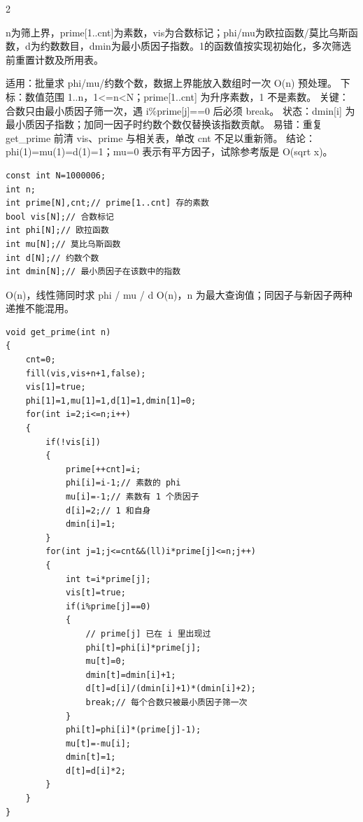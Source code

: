 \documentclass[UTF8,fontset=fandol,a4paper,twoside]{ctexart}
\newcommand{\note}[1]{{\fontsize{10}{12}\selectfont #1\par}}
\begin{document}
\begin{multicols}{2}
\note{n为筛上界，prime[\allowbreak{}1.\allowbreak{}.\allowbreak{}cnt]\allowbreak{}为素数，vis为合数标记；phi/\allowbreak{}mu为欧拉函数/\allowbreak{}莫比乌斯函数，d为约数数目，dmin为最小质因子指数。1的函数值按实现初始化，多次筛选前重置计数及所用表。}
\note{适用：批量求 phi/\allowbreak{}mu/\allowbreak{}约数个数，数据上界能放入数组时一次 O(\allowbreak{}n)\allowbreak{} 预处理。 下标：数值范围 1.\allowbreak{}.\allowbreak{}n，1<\allowbreak{}=\allowbreak{}n<\allowbreak{}N；prime[\allowbreak{}1.\allowbreak{}.\allowbreak{}cnt]\allowbreak{} 为升序素数，1 不是素数。 关键：合数只由最小质因子筛一次，遇 i\%prime[\allowbreak{}j]\allowbreak{}=\allowbreak{}=\allowbreak{}0 后必须 break。 状态：dmin[\allowbreak{}i]\allowbreak{} 为最小质因子指数；加同一因子时约数个数仅替换该指数贡献。 易错：重复 get\_prime 前清 vis、prime 与相关表，单改 cnt 不足以重新筛。 结论：phi(\allowbreak{}1)\allowbreak{}=\allowbreak{}mu(\allowbreak{}1)\allowbreak{}=\allowbreak{}d(\allowbreak{}1)\allowbreak{}=\allowbreak{}1；mu=\allowbreak{}0 表示有平方因子，试除参考版是 O(\allowbreak{}sqrt x)\allowbreak{}。}
\begin{lstlisting}
const int N=1000006;
int n;
int prime[N],cnt;// prime[1..cnt] 存的素数
bool vis[N];// 合数标记
int phi[N];// 欧拉函数
int mu[N];// 莫比乌斯函数
int d[N];// 约数个数
int dmin[N];// 最小质因子在该数中的指数
\end{lstlisting}
\note{O(\allowbreak{}n)\allowbreak{}，线性筛同时求 phi /\allowbreak{} mu /\allowbreak{} d O(\allowbreak{}n)\allowbreak{}，n 为最大查询值；同因子与新因子两种递推不能混用。}
\begin{lstlisting}
void get_prime(int n)
{
    cnt=0;
    fill(vis,vis+n+1,false);
    vis[1]=true;
    phi[1]=1,mu[1]=1,d[1]=1,dmin[1]=0;
    for(int i=2;i<=n;i++)
    {
        if(!vis[i])
        {
            prime[++cnt]=i;
            phi[i]=i-1;// 素数的 phi
            mu[i]=-1;// 素数有 1 个质因子
            d[i]=2;// 1 和自身
            dmin[i]=1;
        }
        for(int j=1;j<=cnt&&(ll)i*prime[j]<=n;j++)
        {
            int t=i*prime[j];
            vis[t]=true;
            if(i%prime[j]==0)
            {
                // prime[j] 已在 i 里出现过
                phi[t]=phi[i]*prime[j];
                mu[t]=0;
                dmin[t]=dmin[i]+1;
                d[t]=d[i]/(dmin[i]+1)*(dmin[i]+2);
                break;// 每个合数只被最小质因子筛一次
            }
            phi[t]=phi[i]*(prime[j]-1);
            mu[t]=-mu[i];
            dmin[t]=1;
            d[t]=d[i]*2;
        }
    }
}
\end{lstlisting}

\end{multicols}
\end{document}
